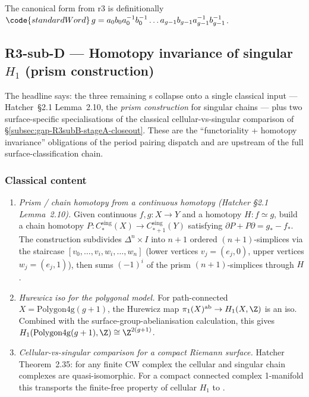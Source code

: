 \begin{lemma}
\label{lem:r3subB-C-r4}
The canonical form from r3 is definitionally
\(\code{standardWord}\,g
=a_{0}b_{0}a_{0}^{-1}b_{0}^{-1}\dots a_{g-1}b_{g-1}a_{g-1}^{-1}b_{g-1}^{-1}\).
\leanok
\end{lemma}

\subsection{R3-sub-D --- Homotopy invariance of singular \(H_1\) (prism construction)}
\label{subsec:gap-R3subD-prism}

The headline says: the three remaining
 s collapse onto a single
classical input --- Hatcher~\S2.1 Lemma~2.10, the
\emph{prism construction} for singular chains --- plus two surface-specific
specialisations of the classical cellular-vs-singular comparison
of \S\ref{subsec:gap-R3subB-stageA-closeout}.  These are the
``functoriality + homotopy invariance'' obligations of the period
pairing dispatch and are upstream of the full surface-classification
chain.

\subsubsection*{Classical content}

\begin{enumerate}
\item \emph{Prism / chain homotopy from a continuous homotopy
(Hatcher \S2.1 Lemma~2.10).}  Given continuous \(f, g : X \to Y\) and a
homotopy \(H : f \simeq g\), build a chain homotopy
\(P : C^{\mathrm{sing}}_{*}(X)\to C^{\mathrm{sing}}_{*+1}(Y)\)
satisfying \(\partial P + P \partial = g_{*} - f_{*}\).  The construction
subdivides \(\Delta^{n} \times I\) into \(n+1\) ordered \((n+1)\)-simplices
via the staircase \([v_{0},\dots,v_{i},w_{i},\dots,w_{n}]\)
(lower vertices \(v_{j} = (e_{j}, 0)\), upper vertices \(w_{j} = (e_{j}, 1)\)),
then sums \((-1)^{i}\) of the prism \((n+1)\)-simplices through \(H\).
\item \emph{Hurewicz iso for the polygonal model.}  For path-connected
\(X = \mathrm{Polygon4g}(g+1)\), the Hurewicz map
\(\pi_{1}(X)^{\mathrm{ab}}\to H_{1}(X,\Z)\) is an iso.  Combined with
the surface-group-abelianisation calculation, this gives
\(H_{1}(\mathrm{Polygon4g}(g+1),\Z)\cong\Z^{2(g+1)}\).
\item \emph{Cellular-vs-singular comparison for a compact Riemann
surface.}  Hatcher Theorem~2.35: for any finite CW complex
the cellular and singular chain complexes are quasi-isomorphic.
For a compact connected complex 1-manifold this transports the
finite-free property of cellular \(H_{1}\) to
.
\end{enumerate}

